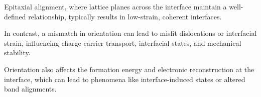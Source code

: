 Epitaxial alignment, where lattice planes across the interface maintain a well-defined relationship, typically results
in low-strain, coherent interfaces\cite{}.

In contrast, a mismatch in orientation can lead to misfit dislocations or interfacial strain, influencing charge carrier
transport, interfacial states, and mechanical stability\cite{Gerber2023-yd, Leung2020-tv, Leitherer2023-ew}.

Orientation also affects the formation energy and electronic reconstruction at the interface, which can lead to
phenomena like interface-induced states or altered band alignments\cite{Alam2020-ci, Chagarov2015-ol, Zhang2016-lt}.

